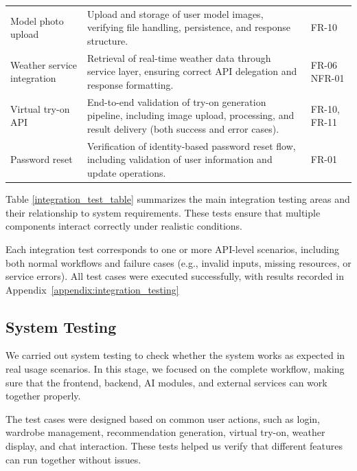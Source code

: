 \begin{table}[H]
\begin{tabular}{p{3.2cm} p{8.8cm} p{2.2cm}}
\addlinespace

Model photo upload 
& Upload and storage of user model images, verifying file handling, persistence, and response structure. 
& FR-10 \\

\addlinespace

Weather service integration 
& Retrieval of real-time weather data through service layer, ensuring correct API delegation and response formatting. 
& FR-06 \newline NFR-01 \\

\addlinespace

Virtual try-on API 
& End-to-end validation of try-on generation pipeline, including image upload, processing, and result delivery (both success and error cases). 
& FR-10, FR-11 \\

\addlinespace

Password reset 
& Verification of identity-based password reset flow, including validation of user information and update operations. 
& FR-01 \\

\bottomrule
\end{tabular}
\end{table}

Table \ref{integration_test_table} summarizes the main integration testing areas and their relationship to system requirements. These tests ensure that multiple components interact correctly under realistic conditions.

Each integration test corresponds to one or more API-level scenarios, including both normal workflows and failure cases (e.g., invalid inputs, missing resources, or service errors). All test cases were executed successfully, with results recorded in Appendix~\ref{appendix:integration_testing} 


\subsection{System Testing}
We carried out system testing to check whether the system works as expected in real usage scenarios.  
In this stage, we focused on the complete workflow, making sure that the frontend, backend, AI modules, and external services can work together properly.

The test cases were designed based on common user actions, such as login, wardrobe management, recommendation generation, virtual try-on, weather display, and chat interaction.  
These tests helped us verify that different features can run together without issues.

